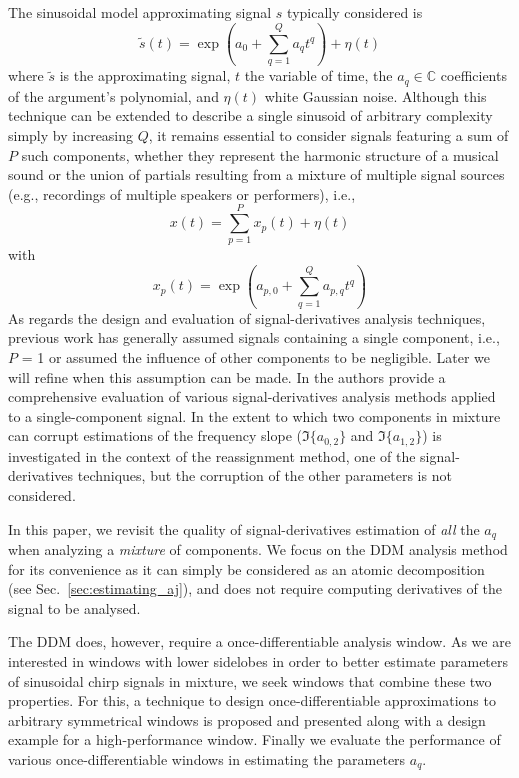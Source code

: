 \documentclass[twoside,a4paper]{article}
\begin{document}
The sinusoidal model approximating signal $s$ typically considered is
%
\begin{equation}
    \label{eq:polyphaseexp}
    \tilde{s}(t) = \exp(a_0 + \sum_{q=1}^{Q} a_{q} t^q) + \eta(t)
\end{equation}
where $\tilde{s}$ is the approximating signal, $t$ the variable of time, the
$a_{q} \in \mathbb{C}$ coefficients of the argument's polynomial, and $\eta(t)$
white Gaussian noise.
%
Although this technique can be extended to describe a single sinusoid of
arbitrary complexity simply by increasing $Q$, it remains essential to consider
signals featuring a sum of $P$ such components, whether they represent the harmonic structure of a musical sound or the union of partials resulting from a mixture of multiple signal sources (e.g., recordings of multiple speakers or performers),  i.e., 
%
\begin{equation}
    x(t) = \sum_{p=1}^{P} x_{p}(t) + \eta(t)
\end{equation}
%
with
%
\begin{equation}
    \label{eq:polyphaseexpmix}
    x_{p}(t) = \exp(a_{p,0} + \sum_{q=1}^{Q} a_{p,q} t^q)
\end{equation}
%
As regards the design and evaluation of signal-derivatives analysis techniques,
previous work has generally assumed signals containing a single component, i.e.,
$P$ = 1 or assumed the influence of other components to be negligible. Later we
will refine when this assumption can be made. In \cite{hamilton2012comparisons}
the authors provide a comprehensive evaluation of various signal-derivatives
analysis methods applied to a single-component signal. In
\cite{robel2002estimating} the extent to which two components in mixture can
corrupt estimations of the frequency slope ($\Im\{a_{0,2}\}$ and
$\Im\{a_{1,2}\}$) is investigated in the context of the reassignment method, one
of the signal-derivatives techniques, but the corruption of the other
parameters is not considered.

In this paper, we revisit the quality of signal-derivatives estimation of
\textit{all} the $a_{q}$ when analyzing a \textit{mixture} of components. We focus on
the DDM \cite{betser2009sinusoidal} analysis method for its convenience as it
can simply be considered as an atomic decomposition (see
Sec.~\ref{sec:estimating_aj}), and does not require computing derivatives
of the signal to be analysed.

The DDM does, however, require a once-differentiable analysis window. As we are
interested in windows with lower sidelobes in order to better estimate
parameters of sinusoidal chirp signals in mixture, we seek windows that
combine these two properties. For this, a technique to design
once-differentiable approximations to arbitrary symmetrical windows is proposed
and presented along with a design example for a high-performance window. Finally
we evaluate the performance of various once-differentiable windows in estimating
the parameters $a_{q}$.
\end{document}
